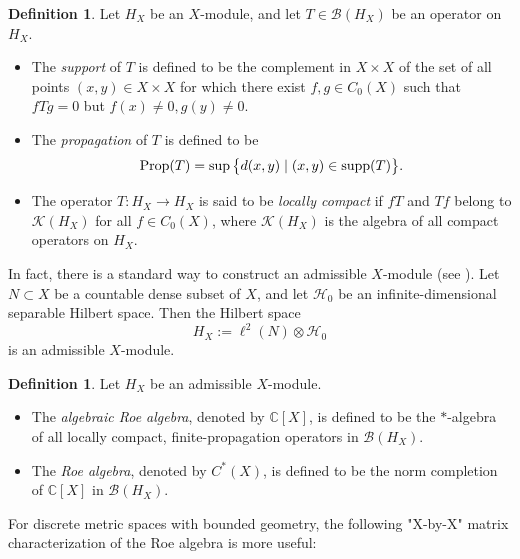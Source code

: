 \documentclass{article}
\theoremstyle{plain}
\theoremstyle{definition}
\newtheorem{definition}[theorem]{Definition}
\theoremstyle{remark}
\def\B{\mathcal B}
\def\K{\mathcal K}
\def\H{\mathcal H}
\begin{document}
	\begin{definition}
		Let $H_X$ be an $X$-module, and let $T\in\B(H_X)$ be an operator on $H_X$.
		\begin{itemize}
			\item[(1)] The {\em support} of $T$ is defined to be the complement in $X\times X$ of the set of all points $(x, y)\in X\times X$ for which there exist $f, g\in C_0(X)$ such that $fTg=0$ but $f(x)\not= 0, g(y)\not=0$.
			\item[(2)] The {\em propagation} of $T$ is defined to be
			$$\textup{Prop}(T)=\sup\big\{ d(x,y) \mid (x, y)\in \textup{supp}(T) \big\}.$$
			\item[(3)] The operator $T: H_X\to H_X$ is said to be {\em locally compact} if $fT$ and $Tf$ belong to $\K(H_X)$ for all $f\in C_0(X)$, where $\K(H_X)$ is the algebra of all compact operators on $H_X$.
	\end{itemize}\end{definition}
	
	In fact, there is a standard way to construct an admissible $X$-module (see \cite{willett2020higher}).
	Let $N\subset X$ be a countable dense subset of $X$, and let $\H_0$ be an infinite-dimensional separable Hilbert space. Then the Hilbert space
	$$H_X:=\ell^2(N)\otimes \H_0$$ is an admissible $X$-module.
	
	
	\begin{definition}
		Let $H_X$ be an admissible $X$-module.
		\begin{itemize}
			\item[(1)] The {\em algebraic Roe algebra}, denoted by $\mathbb C[X]$, is defined to be the $*$-algebra of all locally compact, finite-propagation operators in $\B(H_X)$.
			\item[(2)] The {\em Roe algebra}, denoted by $C^*(X)$, is defined to be the norm completion of $\mathbb{C}[X]$ in $\B(H_X)$.
		\end{itemize}
	\end{definition}
	
	For discrete metric spaces with bounded geometry, the following "X-by-X" matrix characterization of the Roe algebra is more useful:
	
\end{document}
